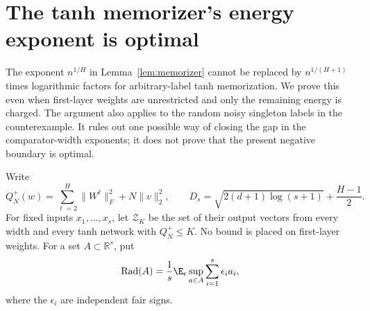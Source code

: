 \appendix
\section{The tanh memorizer's energy exponent is optimal}
\label{app:memorizer-optimality}
The exponent $n^{1/H}$ in Lemma~\ref{lem:memorizer} cannot be replaced by $n^{1/(H+1)}$ times logarithmic factors for arbitrary-label tanh memorization. We prove this even when first-layer weights are unrestricted and only the remaining energy is charged. The argument also applies to the random noisy singleton labels in the counterexample. It rules out one possible way of closing the gap in the comparator-width exponents; it does not prove that the present negative boundary is optimal.

Write
\[
 Q_N^+(w)=\sum_{\ell=2}^H\|W^\ell\|_F^2+N\|v\|_2^2,
 \qquad D_s=\sqrt{2(d+1)\log(s+1)}+\frac{H-1}{2}.
\]
For fixed inputs $x_1,\ldots,x_s$, let $\mathcal Z_K$ be the set of their output vectors from every width and every tanh network with $Q_N^+\le K$. No bound is placed on first-layer weights. For a set $A\subset\mathbb R^s$, put
\[
 \operatorname{Rad}(A)=\frac1s\E_\epsilon\sup_{a\in A}
                       \sum_{i=1}^s\epsilon_i a_i,
\]
where the $\epsilon_i$ are independent fair signs.

